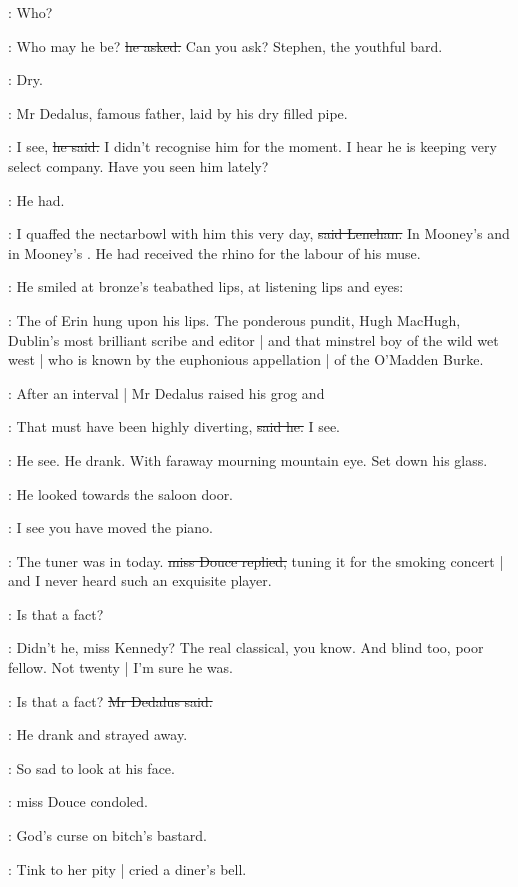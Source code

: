 \lenehan:
Who?

\lenehan:
Who may he be?
\sout{he asked.}
Can you ask?
Stephen,
the youthful bard.

:
Dry.

:
Mr Dedalus,
famous father,
laid by his dry filled pipe.

\simon:
I see,
\sout{he said.}
I didn't recognise him for the moment.
I hear he is keeping very select company.
Have you seen him lately?

:
He had.

\lenehan:
I quaffed the nectarbowl with him this very day,
\sout{said Lenehan.}
In Mooney's 
and in Mooney's .
He had received the rhino for the labour of his muse.

:
He smiled at bronze's teabathed lips,
at listening lips and eyes:

\lenehan:
The  of Erin hung upon his lips.
The ponderous pundit,
Hugh MacHugh,
Dublin's most brilliant scribe and editor |
and that minstrel boy of the wild wet west |
who is known by
the euphonious appellation |
of the O'Madden
Burke.

:
After an interval |
Mr Dedalus raised his grog and

\simon:
That must have been highly diverting,
\sout{said he.}
I see.

:
He see.
He drank.
With faraway mourning mountain eye.
Set down his glass.

:
He looked towards the saloon door.

\simon:
I see you have moved the piano.

\MissD:
The tuner was in today.
\sout{miss Douce replied,}
tuning it for the smoking concert |
and I never heard such an exquisite player.

\simon:
Is that a fact?

\MissD:
Didn't he,
miss Kennedy?
The real classical,
you know.
And blind too,
poor fellow.
Not twenty |
I'm sure he was.

\simon:
Is that a fact?
\sout{Mr Dedalus said.}

:
He drank and strayed away.

\MissD:
So sad to look at his face.

:
miss Douce condoled.

\stripling:
God's curse on bitch's bastard.

:
Tink to her pity |
cried a diner's bell.

